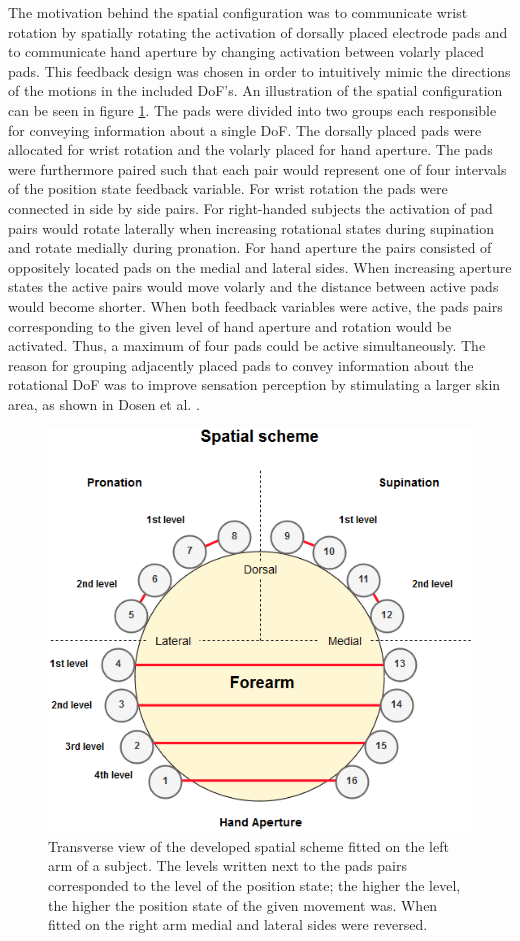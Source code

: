 The motivation behind the spatial configuration was to communicate wrist rotation by spatially rotating the activation of dorsally placed electrode pads and to communicate hand aperture by changing activation between volarly placed pads. 
This feedback design was chosen in order to intuitively mimic the directions of the motions in the included DoF's. An illustration of the spatial configuration can be seen in figure \ref{fig:pa:spatial}. The pads were divided into two groups each responsible for conveying information about a single DoF. The dorsally placed pads were allocated for wrist rotation and the volarly placed for hand aperture. The pads were furthermore paired such that each pair would represent one of four intervals of the position state feedback variable. For wrist rotation the pads were connected in side by side pairs. For right-handed subjects the activation of pad pairs would rotate laterally when increasing rotational states during supination and rotate medially during pronation. For hand aperture the pairs consisted of oppositely located pads on the medial and lateral sides. When increasing aperture states the active pairs would move volarly and the distance between active pads would become shorter. When both feedback variables were active, the pads pairs corresponding to the given level of hand aperture and rotation would be activated. Thus, a maximum of four pads could be active simultaneously. The reason for grouping adjacently placed pads to convey information about the rotational DoF was to improve sensation perception by stimulating a larger skin area, as shown in Dosen et al. \cite{Dosen2015}. 
\begin{figure}[h]                 
	\includegraphics[width=.9\textwidth]{figures/El_array_spatial}  
	\caption{Transverse view of the developed spatial scheme fitted on the left arm of a subject. The levels written next to the pads pairs corresponded to the level of the position state; the higher the level, the higher the position state of the given movement was. When fitted on the right arm medial and lateral sides were reversed.}
	\label{fig:pa:spatial} 
\end{figure}   

